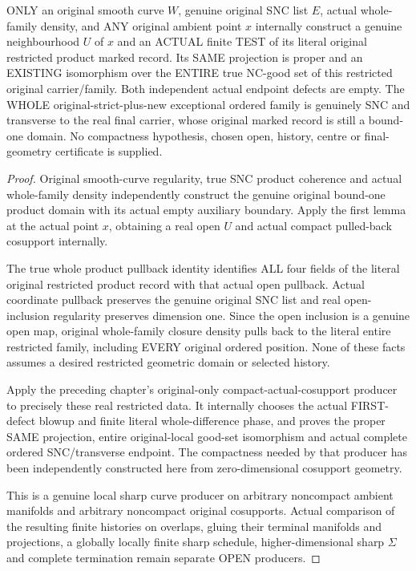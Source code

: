 \begin{theorem}
\label{hir:sharp-original-noncompact-curve-actual-local-sharp-endpoints}
\leanok
ONLY an original smooth curve $W$, genuine original SNC list $E$, actual
whole-family density, and ANY original ambient point $x$ internally
construct a genuine neighbourhood $U$ of $x$ and an ACTUAL finite TEST
of its literal original restricted product marked record. Its SAME
projection is proper and an EXISTING isomorphism over the ENTIRE true
NC-good set of this restricted original carrier/family. Both independent
actual endpoint defects are empty. The WHOLE original-strict-plus-new
exceptional ordered family is genuinely SNC and transverse to the real
final carrier, whose original marked record is still a bound-one domain.
No compactness hypothesis, chosen open, history, centre or final-geometry
certificate is supplied.
\end{theorem}
\begin{proof}
Original smooth-curve regularity, true SNC product coherence and actual
whole-family density independently construct the genuine original
bound-one product domain with its actual empty auxiliary boundary.
Apply the first lemma at the actual point $x$, obtaining a real open $U$
and actual compact pulled-back cosupport internally.

The true whole product pullback identity identifies ALL four fields of
the literal original restricted product record with that actual open
pullback. Actual coordinate pullback preserves the genuine original SNC
list and real open-inclusion regularity preserves dimension one. Since
the open inclusion is a genuine open map, original whole-family closure
density pulls back to the literal entire restricted family, including
EVERY original ordered position. None of these facts assumes a desired
restricted geometric domain or selected history.

Apply the preceding chapter's original-only compact-actual-cosupport
producer to precisely these real restricted data. It internally chooses
the actual FIRST-defect blowup and finite literal whole-difference phase,
and proves the proper SAME projection, entire original-local good-set
isomorphism and actual complete ordered SNC/transverse endpoint. The
compactness needed by that producer has been independently constructed
here from zero-dimensional cosupport geometry.

This is a genuine local sharp curve producer on arbitrary noncompact
ambient manifolds and arbitrary noncompact original cosupports. Actual
comparison of the resulting finite histories on overlaps, gluing their
terminal manifolds and projections, a globally locally finite sharp
schedule, higher-dimensional sharp $\Sigma$ and complete termination
remain separate OPEN producers.
\end{proof}
